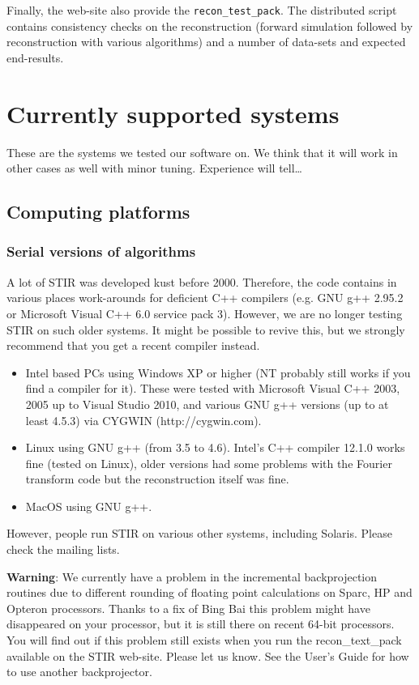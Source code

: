 \documentclass{article}
\begin{document}
Finally, the web-site also provide the \texttt{recon\_test\_pack}.
The distributed script contains consistency checks on the reconstruction
(forward simulation followed by reconstruction with various algorithms) and
a number of data-sets and expected end-results.


\section{
Currently supported systems}

These are the systems we tested our software on. We think that 
it will work in other cases as well with minor tuning. Experience 
will tell\dots 



\subsection{
Computing platforms}


\subsubsection{
Serial versions of algorithms}
A lot of STIR was developed kust before 2000. Therefore, the code
contains in various places work-arounds for deficient C++ compilers
(e.g. GNU g++ 2.95.2 or Microsoft Visual C++ 6.0 service pack 3). 
However, we are no longer
testing STIR on such older systems. It might be possible to revive this,
but we strongly recommend that you get a recent compiler instead.
\begin{itemize}
\item 
Intel based PCs using Windows XP or higher (NT probably still works if you
find a compiler for it). These were tested with Microsoft Visual C++ 2003, 2005 up to
Visual Studio 2010,
and various GNU g++ versions (up to at least 4.5.3) via CYGWIN (http://cygwin.com).
\item 
Linux using GNU g++ (from 3.5 to 4.6).
Intel's C++ compiler 12.1.0  works fine (tested on Linux), older versions had some problems with the Fourier transform code but the reconstruction itself was fine.
\item
MacOS using GNU g++.
\end{itemize}
However, people run STIR on various other systems, including Solaris. Please
check the mailing lists.

\textbf{Warning}: 
We currently have a problem 
in the incremental backprojection routines due to different rounding 
of floating point calculations on Sparc, HP and Opteron processors. 
Thanks to a fix of Bing Bai this problem might have disappeared on your processor, but it is still there on recent 64-bit processors.
You will find out if this problem still exists when you run the 
recon\_text\_pack available on the STIR web-site. Please let us know.
See the User's Guide for how to use another backprojector.
\end{document}
